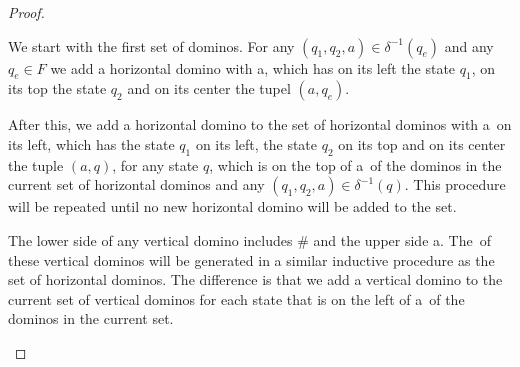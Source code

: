 \begin{proof}
\begin{compactenum}[(I)]
We start with the first set of dominos. For any $(q_1, q_2, a)\in\delta^{-1}(q_e)$ and any
$q_e\in F$ we add a horizontal domino with a\mirroredL, which has on its left the state $q_1$, on
its top the state $q_2$ and on its center the tupel $(a, q_e)$.

After this, we add a horizontal domino to the set of horizontal dominos with a\mirroredL~on its
left, which has the state $q_1$ on its left, the state $q_2$ on its top and on its center
the tuple $(a, q)$, for any state $q$, which is on the top of a\mirroredL~of the dominos in the
current set of horizontal dominos and any $(q_1, q_2, a)\in\delta^{-1}(q)$. This procedure will be
repeated until no new horizontal domino will be added to the set.

The lower side of any vertical domino includes $\#$ and the upper side a\mirroredL. The\mirroredL~of
these vertical dominos will be generated in a similar inductive procedure as the set of
horizontal dominos. The difference is that we add a vertical domino to the current set of vertical
dominos for each state that is on the left of a\mirroredL~of the dominos in the current set.


\end{compactenum}
\end{proof}
